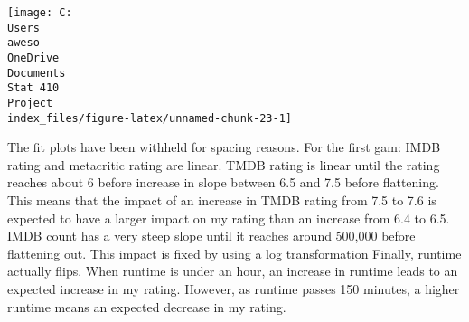 \documentclass[
]{article}
\newenvironment{Shaded}{\begin{snugshade}}{\end{snugshade}}
\newcommand{\AttributeTok}[1]{\textcolor[rgb]{0.77,0.63,0.00}{#1}}
\newcommand{\DecValTok}[1]{\textcolor[rgb]{0.00,0.00,0.81}{#1}}
\newcommand{\FunctionTok}[1]{\textcolor[rgb]{0.00,0.00,0.00}{#1}}
\newcommand{\NormalTok}[1]{#1}
\newcommand{\SpecialCharTok}[1]{\textcolor[rgb]{0.00,0.00,0.00}{#1}}
\newcommand{\StringTok}[1]{\textcolor[rgb]{0.31,0.60,0.02}{#1}}
\begin{document}
\begin{Shaded}
\end{Shaded}

\texttt{[image: C:\\Users\\aweso\\OneDrive\\Documents\\Stat 410\\Project\\index\_files/figure-latex/unnamed-chunk-23-1]}

The fit plots have been withheld for spacing reasons. For the first gam:
IMDB rating and metacritic rating are linear. TMDB rating is linear
until the rating reaches about 6 before increase in slope between 6.5
and 7.5 before flattening. This means that the impact of an increase in
TMDB rating from 7.5 to 7.6 is expected to have a larger impact on my
rating than an increase from 6.4 to 6.5. IMDB count has a very steep
slope until it reaches around 500,000 before flattening out. This impact
is fixed by using a log transformation Finally, runtime actually flips.
When runtime is under an hour, an increase in runtime leads to an
expected increase in my rating. However, as runtime passes 150 minutes,
a higher runtime means an expected decrease in my rating.
\end{document}
